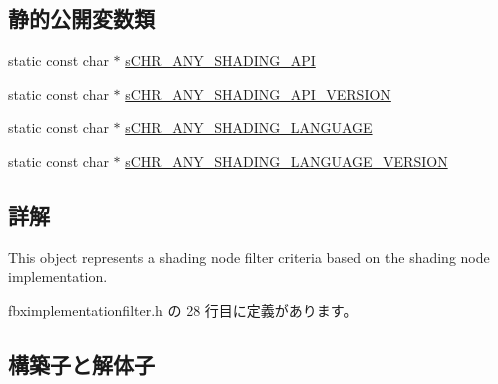 \subsection*{静的公開変数類}
\begin{DoxyCompactItemize}
\item 
static const char $\ast$ \hyperlink{class_fbx_implementation_filter_a596d1d4050df2c9a608520ee6dd6bdfd}{s\+C\+H\+R\+\_\+\+A\+N\+Y\+\_\+\+S\+H\+A\+D\+I\+N\+G\+\_\+\+A\+PI}
\item 
static const char $\ast$ \hyperlink{class_fbx_implementation_filter_ac81682276ccaaf912fa5795b1b90110d}{s\+C\+H\+R\+\_\+\+A\+N\+Y\+\_\+\+S\+H\+A\+D\+I\+N\+G\+\_\+\+A\+P\+I\+\_\+\+V\+E\+R\+S\+I\+ON}
\item 
static const char $\ast$ \hyperlink{class_fbx_implementation_filter_a682a04bbd0db2b4ff00e13cecb27badc}{s\+C\+H\+R\+\_\+\+A\+N\+Y\+\_\+\+S\+H\+A\+D\+I\+N\+G\+\_\+\+L\+A\+N\+G\+U\+A\+GE}
\item 
static const char $\ast$ \hyperlink{class_fbx_implementation_filter_af479f36e72bb5dd80c400edbab0ceafe}{s\+C\+H\+R\+\_\+\+A\+N\+Y\+\_\+\+S\+H\+A\+D\+I\+N\+G\+\_\+\+L\+A\+N\+G\+U\+A\+G\+E\+\_\+\+V\+E\+R\+S\+I\+ON}
\end{DoxyCompactItemize}


\subsection{詳解}
This object represents a shading node filter criteria based on the shading node implementation. 

 fbximplementationfilter.\+h の 28 行目に定義があります。



\subsection{構築子と解体子}
\mbox{\label{class_fbx_implementation_filter_ab53b0ef25ada946751aaa8df6490809b}} 

